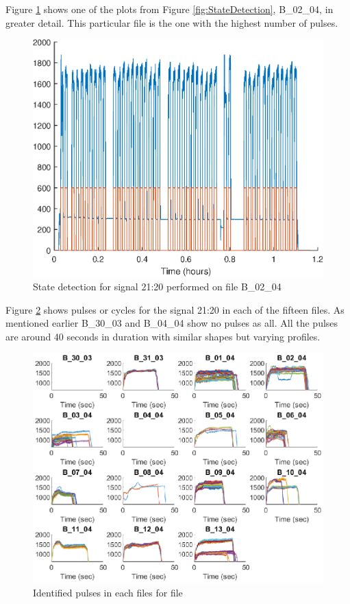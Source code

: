 \documentclass{article}
\begin{document}
Figure \ref{fig:StateDetectionFig_B_02_04} shows one of the plots from Figure \ref{fig:StateDetection}, B\_02\_04, in greater detail. This particular file is the one with the highest number of pulses.

\begin{figure}[H]
    \centering
    \includegraphics[scale=0.75]{figures/StateDetectionFig_B_02_04.eps}
    \caption{State detection for signal 21:20 performed on file B\_02\_04}
    \label{fig:StateDetectionFig_B_02_04}
\end{figure}

Figure \ref{fig:IdentifiedPulses} shows pulses or cycles for the signal 21:20 in each of the fifteen files. As mentioned earlier B\_30\_03 and B\_04\_04 show no pulses as all. All the pulses are around 40 seconds in duration with similar shapes but varying profiles.
 
\begin{figure}[H]
    \centering
    \includegraphics[width=\textwidth, height=\textheight, keepaspectratio]{figures/IdentifiedPulsesFig.eps}
    \caption{Identified pulses in each files for file}
    \label{fig:IdentifiedPulses}
\end{figure}
\end{document}
